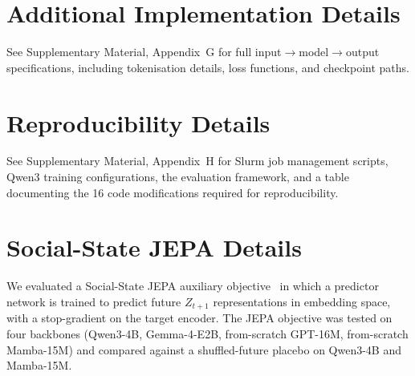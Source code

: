 \documentclass[11pt]{article}
\begin{document}
\section{Additional Implementation Details}
\label{app:dataflow}

See Supplementary Material, Appendix~G for full input$\rightarrow$model$\rightarrow$output specifications, including tokenisation details, loss functions, and checkpoint paths.

\section{Reproducibility Details}
\label{app:infrastructure}

See Supplementary Material, Appendix~H for Slurm job management scripts, Qwen3 training configurations, the evaluation framework, and a table documenting the 16 code modifications required for reproducibility.


\section{Social-State JEPA Details}
\label{app:jepa}

We evaluated a Social-State JEPA auxiliary objective~\cite{lecun2022path,assran2023self} in which a predictor network is trained to predict future $Z_{t+1}$ representations in embedding space, with a stop-gradient on the target encoder.
The JEPA objective was tested on four backbones (Qwen3-4B, Gemma-4-E2B, from-scratch GPT-16M, from-scratch Mamba-15M) and compared against a shuffled-future placebo on Qwen3-4B and Mamba-15M.

\begin{table}[tp]
\centering
\caption{JEPA per-backbone results. Positive $\Delta$ means JEPA improves over base. Shuffled-future placebo partially replicates gains, indicating temporal structure is not the sole driver.}
\label{tab:jepa_appendix}
\footnotesize\setlength{\tabcolsep}{2pt}
\end{table}
\end{document}
